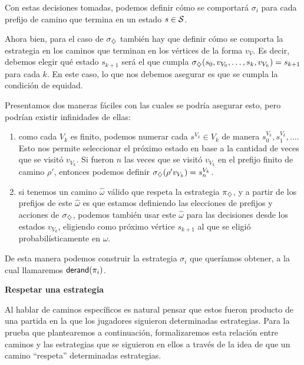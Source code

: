 Con estas decisiones tomadas, podemos definir cómo se comportará $\sigma_i$
para cada prefijo de camino que termina en un estado $s \in \mathcal{S}$.

Ahora bien, para el caso de $\sigma_\diamondsuit$ también hay que definir cómo se
comporta la estrategia en los caminos que terminan en los vértices de la forma
$v_V$. Es decir, debemos elegir qué estado $s_{k+1}$ será el que cumpla
$\sigma_\diamondsuit(s_0, v_{V_0}, \dots, s_k, v_{V_k}) = s_{k+1}$ para cada $k$. En
este caso, lo que nos debemos asegurar es que se cumpla la condición de
equidad.

\begin{boxgris}{}
	Presentamos dos maneras fáciles con las cuales se podría asegurar esto, pero
	podrían existir infinidades de ellas:
	\begin{enumerate}
		\item como cada $V_k$ es finito, podemos numerar cada $s^{V_k} \in V_k$ de manera
		      $s_0^{V_k}, s_1^{V_k}, \dots$. Esto nos permite seleccionar el próximo estado
		      en base a la cantidad de veces que se visitó $v_{V_k}$. Si fueron $n$ las veces
		      que se visitó $v_{V_k}$ en el prefijo finito de camino $\rho '$, entonces
		      podemos definir $\sigma_\diamondsuit(\rho ' v_{V_k}) = s_n^{V_k}$.
		\item si tenemos un camino $\hat \omega$ válido que respeta la estrategia
		      $\pi_\diamondsuit$, y a partir de los prefijos de este $\hat \omega$ es que estamos
		      definiendo las elecciones de prefijos y acciones de $\sigma_\diamondsuit$, podemos
		      también usar este $\hat \omega$ para las decisiones desde los estados
		      $v_{V_k}$, eligiendo como próximo vértice $s_{k+1}$ al que se eligió
		      probabilísticamente en $\hat \omega$.
	\end{enumerate}
\end{boxgris}

De esta manera podemos construir la estrategia $\sigma_i$ que queríamos
obtener, a la cual llamaremos $\textsf{derand}(\pi_i)$.

\textbf{Respetar una estrategia}

Al hablar de caminos específicos es natural pensar que estos fueron producto de
una partida en la que los jugadores siguieron determinadas estrategias. Para la
prueba que plantearemos a continuación, formalizaremos esta relación entre
caminos y las estrategias que se siguieron en ellos a través de la idea de que
un camino ``respeta'' determinadas estrategias.

